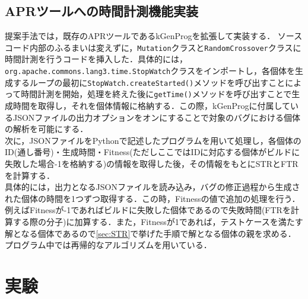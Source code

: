 \documentclass[uplatex,dvipdfmx,a4paper]{jsarticle}
\let\oldcite\cite
\renewcommand{\cite}[1]{\xspace\oldcite{#1}}
\begin{document}
\subsection{APRツールへの時間計測機能実装} \label{sec:impl}
提案手法では，既存のAPRツールであるkGenProg\cite{higo2018kgenprog}を拡張して実装する．
ソースコード内部のふるまいは変えずに，\texttt{Mutation}クラスと\texttt{RandomCrossover}クラスに時間計測を行うコードを挿入した．具体的には，\texttt{org.apache.commons.lang3.time.StopWatch}クラスをインポートし，各個体を生成するループの最初に\texttt{StopWatch.createStarted()}メソッドを呼び出すことによって時間計測を開始，処理を終えた後に\texttt{getTime()}メソッドを呼び出すことで生成時間を取得し，それを個体情報に格納する．この際，kGenProgに付属しているJSONファイルの出力オプションをオンにすることで対象のバグにおける個体の解析を可能にする．\\
次に，JSONファイルをPythonで記述したプログラムを用いて処理し，各個体のID(通し番号)・生成時間・Fitness(ただしここではIDに対応する個体がビルドに失敗した場合-1を格納する)の情報を取得した後，その情報をもとにSTRとFTRを計算する．\\
具体的には，出力となるJSONファイルを読み込み，バグの修正過程から生成された個体の時間を1つずつ取得する．この時，Fitnessの値で追加の処理を行う．例えばFitnessが-1であればビルドに失敗した個体であるので失敗時間(FTRを計算する際の分子)に加算する．また，Fitnessが1であれば，テストケースを満たす解となる個体であるので\ref{sec:STR}で挙げた手順で解となる個体の親を求める．プログラム中では再帰的なアルゴリズムを用いている．\\
\clearpage
\section{実験} \label{sec:exp}
\end{document}
